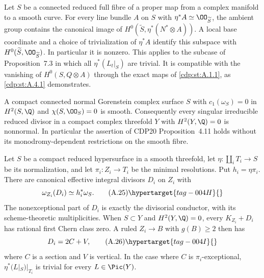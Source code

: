 \begin{proposition}\hypertarget{tag-01AZ}{}\label{cdp:st:A.5.1}


Let $S$ be a connected reduced full fibre of a proper map from a complex manifold to a smooth curve. For every line bundle $A$ on $S$ with $\eta^*A\simeq\OO_{\widetilde S}$, the ambient group contains the canonical image of $H^0(\widetilde S,\eta^*(N^*\otimes A))$. A local base coordinate and a choice of trivialization of $\eta^*A$ identify this subspace with $H^0(\widetilde S,\OO_{\widetilde S})$. In particular it is nonzero. This applies to the subcase of Proposition~7.3 in which all $\eta^*(L_t|_S)$ are trivial. It is compatible with the vanishing of $H^0(S,Q\otimes A)$ through the exact maps of \ref{cdp:st:A.1.1}, as \ref{cdp:st:A.4.1} demonstrates.
\end{proposition}

\begin{proposition}\hypertarget{tag-01BA}{}\label{cdp:st:A.5.2}


A compact connected normal Gorenstein complex surface $S$ with $c_1(\omega_S)=0$ in $H^2(S,\Q)$ and $\chi(S,\OO_S)=0$ is smooth. Consequently every singular irreducible reduced divisor in a compact complex threefold $Y$ with $H^2(Y,\Q)=0$ is nonnormal. In particular the assertion of CDP20 Proposition~4.11 holds without its monodromy-dependent restrictions on the smooth fibre.
\end{proposition}

\begin{proposition}\hypertarget{tag-01BD}{}\label{cdp:st:A.5.3}


Let $S$ be a compact reduced hypersurface in a smooth threefold, let $\eta:\coprod_i T_i\to S$ be its normalization, and let $\pi_i:Z_i\to T_i$ be the minimal resolutions. Put $h_i=\eta\pi_i$. There are canonical effective integral divisors $D_i$ on $Z_i$ with
\[
 \omega_{Z_i}(D_i)\simeq h_i^*\omega_S.
 \tag{A.25}\hypertarget{tag-004H}{}\label{cdp:eq:A.25}
\]
The nonexceptional part of $D_i$ is exactly the divisorial conductor, with its scheme-theoretic multiplicities. When $S\subset Y$ and $H^2(Y,\Q)=0$, every $K_{Z_i}+D_i$ has rational first Chern class zero. A ruled $Z_i\to B$ with $g(B)\ge2$ then has
\[
 D_i=2C+V,
 \tag{A.26}\hypertarget{tag-004I}{}\label{cdp:eq:A.26}
\]
where $C$ is a section and $V$ is vertical. In the case where $C$ is $\pi_i$-exceptional, $\eta^*(L|_S)|_{T_i}$ is trivial for every $L\in\Pic(Y)$.
\end{proposition}

